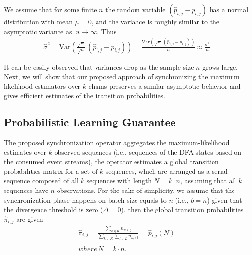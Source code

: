We assume that for some finite $n$ the random variable $(\hat{p}_{i,j} - {p}_{i,j})$ has a normal distribution with mean $\mu=0$, and the variance is roughly similar to the asymptotic variance  as $\ n \xrightarrow{} \infty$. Thus 
\begin{equation}
\begin{aligned}
\label{eq:var_isol}
	\widehat{\sigma}^{2} = \mathrm{Var} (\frac {\sqrt{n}}{\sqrt{n}}\  (\hat{p}_{i,j} - {p}_{i,j})) = \frac {\mathrm{Var}(\sqrt{n}\ (\hat{p}_{i,j} - {p}_{i,j}))}{n} \approx \frac {\sigma^{2}}{n}
\end{aligned}
\end{equation}

It can be easily observed that variances drop as the sample size $n$ grows large.  Next, we will show that our proposed approach of synchronizing the maximum likelihood estimators over $k$ chains preserves a similar asymptotic behavior and gives efficient estimates of the transition probabilities.


\subsection{Probabilistic Learning Guarantee}
\label{sec:guarantee}
\par The proposed synchronization operator aggregates the maximum-likelihood estimates over $k$ observed sequences (i.e., sequences of the DFA states based on the consumed event streams), the operator estimates a global transition probabilities matrix for a set of $k$ sequences, which are arranged as a serial sequence composed of all $k$ sequences with length $N=k \cdot n$, assuming that all $k$ sequences have $n$ observations. For the sake of simplicity, we assume that the synchronization phase happens on batch size equals to $n$ (i.e., $b=n$) given that the divergence threshold is zero ($\Delta=0$), then the global transition probabilities $\hat{\pi}_{i,j}$ are given 
\begin{equation}
\label{eq:dis_pi_estim2}
	\begin{aligned}
\hat{\pi}_{i,j}=\frac{\sum_{k \in K} n_{k,i,j}}{\sum_{k \in K} \sum_{l \in L} n_{k,i,l}} = \hat{p}_{i,j}(N)\\\\
 where\ N = k \cdot n.
 \end{aligned}
\end{equation}


